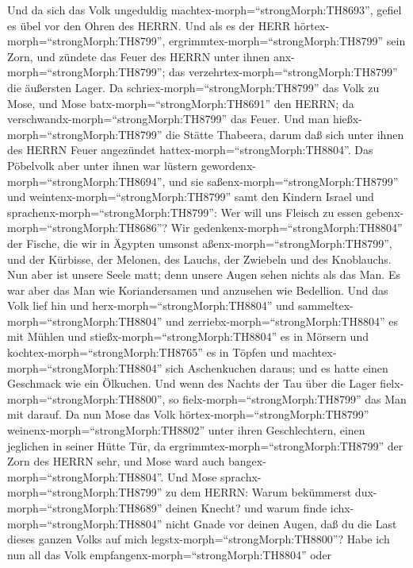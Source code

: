  Und da sich das Volk ungeduldig
machtex-morph=``strongMorph:TH8693'', gefiel es übel vor den Ohren des
HERRN. Und als es der HERR hörtex-morph=``strongMorph:TH8799'',
ergrimmtex-morph=``strongMorph:TH8799'' sein Zorn, und zündete das Feuer
des HERRN unter ihnen anx-morph=``strongMorph:TH8799''; das
verzehrtex-morph=``strongMorph:TH8799'' die äußersten Lager.
 Da schriex-morph=``strongMorph:TH8799'' das Volk zu Mose,
und Mose batx-morph=``strongMorph:TH8691'' den HERRN; da
verschwandx-morph=``strongMorph:TH8799'' das Feuer.  Und man
hießx-morph=``strongMorph:TH8799'' die Stätte Thabeera, darum daß sich
unter ihnen des HERRN Feuer angezündet
hattex-morph=``strongMorph:TH8804''.  Das Pöbelvolk aber
unter ihnen war lüstern gewordenx-morph=``strongMorph:TH8694'', und sie
saßenx-morph=``strongMorph:TH8799'' und
weintenx-morph=``strongMorph:TH8799'' samt den Kindern Israel und
sprachenx-morph=``strongMorph:TH8799'': Wer will uns Fleisch zu essen
gebenx-morph=``strongMorph:TH8686''?  Wir
gedenkenx-morph=``strongMorph:TH8804'' der Fische, die wir in Ägypten
umsonst aßenx-morph=``strongMorph:TH8799'', und der Kürbisse, der
Melonen, des Lauchs, der Zwiebeln und des Knoblauchs.  Nun
aber ist unsere Seele matt; denn unsere Augen sehen nichts als das Man.
 Es war aber das Man wie Koriandersamen und anzusehen wie
Bedellion.  Und das Volk lief hin und
herx-morph=``strongMorph:TH8804'' und
sammeltex-morph=``strongMorph:TH8804'' und
zerriebx-morph=``strongMorph:TH8804'' es mit Mühlen und
stießx-morph=``strongMorph:TH8804'' es in Mörsern und
kochtex-morph=``strongMorph:TH8765'' es in Töpfen und
machtex-morph=``strongMorph:TH8804'' sich Aschenkuchen daraus; und es
hatte einen Geschmack wie ein Ölkuchen.  Und wenn des Nachts
der Tau über die Lager fielx-morph=``strongMorph:TH8800'', so
fielx-morph=``strongMorph:TH8799'' das Man mit darauf.  Da
nun Mose das Volk hörtex-morph=``strongMorph:TH8799''
weinenx-morph=``strongMorph:TH8802'' unter ihren Geschlechtern, einen
jeglichen in seiner Hütte Tür, da
ergrimmtex-morph=``strongMorph:TH8799'' der Zorn des HERRN sehr, und
Mose ward auch bangex-morph=``strongMorph:TH8804''.  Und
Mose sprachx-morph=``strongMorph:TH8799'' zu dem HERRN: Warum bekümmerst
dux-morph=``strongMorph:TH8689'' deinen Knecht? und warum finde
ichx-morph=``strongMorph:TH8804'' nicht Gnade vor deinen Augen, daß du
die Last dieses ganzen Volks auf mich
legstx-morph=``strongMorph:TH8800''?  Habe ich nun all das
Volk empfangenx-morph=``strongMorph:TH8804'' oder
